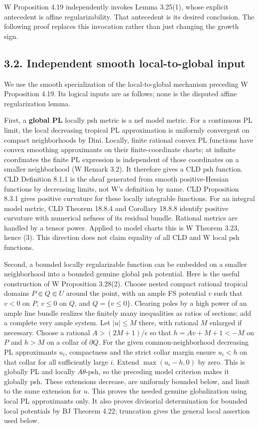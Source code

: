 \documentclass[
  11pt,
]{article}
\begin{document}
W Proposition 4.19 independently invokes Lemma 3.25(1), whose explicit
antecedent is affine regularizability. That antecedent is its desired
conclusion. The following proof replaces this invocation rather than
just changing the growth sign.

\subsection{3.2. Independent smooth local-to-global
input}\label{independent-smooth-local-to-global-input}

We use the smooth specialization of the local-to-global mechanism
preceding W Proposition 4.19. Its logical inputs are as follows; none is
the disputed affine regularization lemma.

First, a \textbf{global PL} locally psh metric is a nef model metric.
For a continuous PL limit, the local decreasing tropical PL
approximation is uniformly convergent on compact neighborhoods by Dini.
Locally, finite rational convex PL functions have convex smoothing
approximants on their finite-coordinate charts; at infinite coordinates
the finite PL expression is independent of those coordinates on a
smaller neighborhood (W Remark 3.2). It therefore gives a CLD psh
function. CLD Definition 8.1.1 is the sheaf generated from smooth
positive-Hessian functions by decreasing limits, not W's definition by
name. CLD Proposition 8.3.1 gives positive curvature for these locally
integrable functions. For an integral model metric, CLD Theorem 18.8.4
and Corollary 18.8.8 identify positive curvature with numerical nefness
of its residual bundle. Rational metrics are handled by a tensor power.
Applied to model charts this is W Theorem 3.23, hence (3). This
direction does not claim equality of all CLD and W local psh functions.

Second, a bounded locally regularizable function can be embedded on a
smaller neighborhood into a bounded genuine global psh potential. Here
is the useful construction of W Proposition 3.28(2). Choose nested
compact rational tropical domains \(P\Subset Q\Subset U\) around the
point, with an ample FS potential \(v\) such that \(v<0\) on \(P\),
\(v\leq0\) on \(Q\), and \(Q=\{v\leq0\}\). Clearing poles by a high
power of an ample line bundle realizes the finitely many inequalities as
ratios of sections; add a complete very ample system. Let \(|u|\leq M\)
there, with rational \(M\) enlarged if necessary. Choose a rational
\(A>(2M+1)/\epsilon\) so that \(h=Av+M+1<-M\) on \(P\) and \(h>M\) on a
collar of \(\partial Q\). For the given common-neighborhood decreasing
PL approximants \(u_i\), compactness and the strict collar margin ensure
\(u_i<h\) on that collar for all sufficiently large \(i\). Extend
\(\max(u_i-h,0)\) by zero. This is globally PL and locally
\(A\theta\)-psh, so the preceding model criterion makes it globally psh.
These extensions decrease, are uniformly bounded below, and limit to the
same extension for \(u\). This proves the needed genuine globalization
using local PL approximants only. It also proves divisorial
determination for bounded local potentials by BJ Theorem 4.22;
truncation gives the general local assertion used below.
\end{document}
